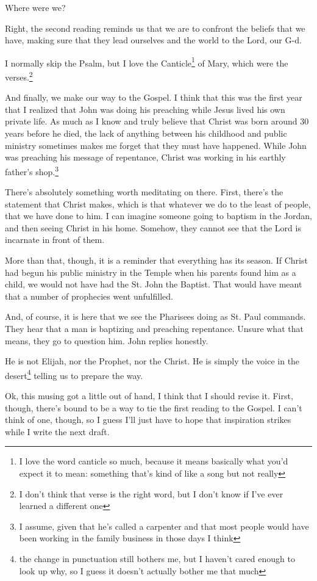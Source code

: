 \documentclass[12pt]{article}[titlepage]
\newcommand{\1}{\={a}}
\newcommand{\2}{\={e}}
\newcommand{\3}{\={\i}}
\newcommand{\4}{\=o}
\newcommand{\5}{\=u}
\newcommand{\6}{\={A}}
\renewcommand{\,}{\textsuperscript{,}}
\begin{document}
Where were we?

Right, the second reading reminds us that we are to confront the beliefs that we have, making sure that they lead ourselves and the world to the Lord, our G-d.

I normally skip the Psalm, but I love the Canticle\footnote{I love the word canticle so much, because it means basically what you'd expect it to mean: something that's kind of like a song but not really} of Mary, which were the verses.\footnote{I don't think that verse is the right word, but I don't know if I've ever learned a different one}

And finally, we make our way to the Gospel.
I think that this was the first year that I realized that John was doing his preaching while Jesus lived his own private life.
As much as I know and truly believe that Christ was born around 30 years before he died, the lack of anything between his childhood and public ministry sometimes makes me forget that they must have happened.
While John was preaching his message of repentance, Christ was working in his earthly father's shop.\footnote{I assume, given that he's called a carpenter and that most people would have been working in the family business in those days I think}

There's absolutely something worth meditating on there.
First, there's the statement that Christ makes, which is that whatever we do to the least of people, that we have done to him.
I can imagine someone going to baptism in the Jordan, and then seeing Christ in his home.
Somehow, they cannot see that the Lord is incarnate in front of them.

More than that, though, it is a reminder that everything has its season.
If Christ had begun his public ministry in the Temple when his parents found him as a child, we would not have had the St. John the Baptist.
That would have meant that a number of prophecies went unfulfilled.

And, of course, it is here that we see the Pharisees doing as St. Paul commands.
They hear that a man is baptizing and preaching repentance.
Unsure what that means, they go to question him.
John replies honestly.

He is not Elijah, nor the Prophet, nor the Christ.
He is simply the voice in the desert\footnote{the change in punctuation still bothers me, but I haven't cared enough to look up why, so I guess it doesn't actually bother me that much} telling us to prepare the way.

Ok, this musing got a little out of hand, I think that I should revise it.
First, though, there's bound to be a way to tie the first reading to the Gospel.
I can't think of one, though, so I guess I'll just have to hope that inspiration strikes while I write the next draft.
\end{document}
